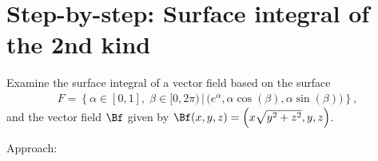 \documentclass[12pt]{article}
\begin{document}
\clearpage
\section{Step-by-step: Surface integral of the 2nd kind}
\begin{exampleboxed}
	Examine the 
	surface integral of a vector field based on 
	the surface
	\begin{align}
		F =
		\left\{
		\alpha\in[0,1],\; \beta \in \Big[ 0,2\pi \Big)
		\,\Bigg|\,
		\Big( e^\alpha, \alpha\cos(\beta), \alpha\sin(\beta) \Big)
		\right\},
	\end{align}
	and the vector field  $\Bf$ given by
	$\Bf(x,y,z) = \Big( x\sqrt{y^2+z^2}, y, z \Big)$.
\end{exampleboxed}
Approach:
\end{document}
